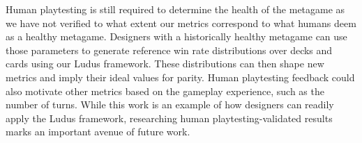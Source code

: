 \documentclass[letterpaper]{article} %
\begin{document}
Human playtesting is still required to determine the health of the metagame as we have not verified to what extent our metrics
correspond to what humans deem as a healthy metagame. Designers
with a historically healthy metagame can use those parameters to generate reference win rate distributions 
over decks and cards using our {\sc Ludus} framework. These distributions can then shape 
new metrics and imply their ideal values for parity. Human playtesting feedback could also motivate other metrics based on the gameplay experience,
such as the number of turns. %
While this work is an example of how designers can readily apply the {\sc Ludus} framework,
researching human playtesting-validated results marks an important avenue of 
future work.


\end{document}
